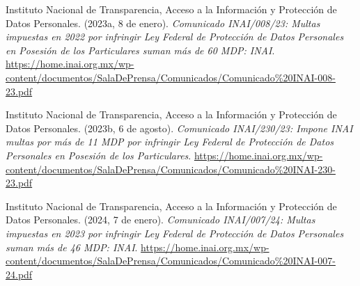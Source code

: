 \documentclass[12pt, a4paper]{article}
\begin{document}
\begin{list}{}{\setlength{\leftmargin}{1.27cm}\setlength{\itemindent}{-1.27cm}%
  \setlength{\labelwidth}{0pt}\setlength{\labelsep}{0pt}\setlength{\itemsep}{6pt}}

\item Instituto Nacional de Transparencia, Acceso a la Información
  y Protección de Datos Personales. (2023a, 8 de enero).
  \textit{Comunicado INAI/008/23: Multas impuestas en 2022 por
  infringir Ley Federal de Protección de Datos Personales en Posesión
  de los Particulares suman más de 60 MDP: INAI}.
  \url{https://home.inai.org.mx/wp-content/documentos/SalaDePrensa/Comunicados/Comunicado%20INAI-008-23.pdf}


\item Instituto Nacional de Transparencia, Acceso a la Información
  y Protección de Datos Personales. (2023b, 6 de agosto).
  \textit{Comunicado INAI/230/23: Impone INAI multas por más de
  11 MDP por infringir Ley Federal de Protección de Datos Personales
  en Posesión de los Particulares}.
  \url{https://home.inai.org.mx/wp-content/documentos/SalaDePrensa/Comunicados/Comunicado%20INAI-230-23.pdf}


\item Instituto Nacional de Transparencia, Acceso a la Información
  y Protección de Datos Personales. (2024, 7 de enero).
  \textit{Comunicado INAI/007/24: Multas impuestas en 2023 por
  infringir Ley Federal de Protección de Datos Personales suman más
  de 46 MDP: INAI}.
  \url{https://home.inai.org.mx/wp-content/documentos/SalaDePrensa/Comunicados/Comunicado%20INAI-007-24.pdf}
 
 

\end{list}
\end{document}
